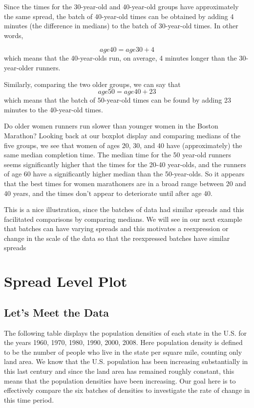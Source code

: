 \documentclass[
]{book}
\begin{document}
Since the times for the 30-year-old and 40-year-old groups have approximately the same spread, the batch of 40-year-old times can be obtained by adding 4 minutes (the difference in medians) to the batch of 30-year-old times. In other words,

\[
age40 = age30 + 4
\]
which means that the 40-year-olds run, on average, 4 minutes longer than the 30-year-older runners.

Similarly, comparing the two older groups, we can say that
\[
age50 = age40 + 23
\]
which means that the batch of 50-year-old times can be found by adding 23 minutes to the 40-year-old times.

Do older women runners run slower than younger women in the Boston Marathon? Looking back at our boxplot display and comparing medians of the five groups, we see that women of ages 20, 30, and 40 have (approximately) the same median completion time. The median time for the 50 year-old runners seems significantly higher that the times for the 20-40 year-olds, and the runners of age 60 have a significantly higher median than the 50-year-olds. So it appears that the best times for women marathoners are in a broad range between 20 and 40 years, and the times don't appear to deteriorate until after age 40.

This is a nice illustration, since the batches of data had similar spreads and this facilitated comparisons by comparing medians. We will see in our next example that batches can have varying spreads and this motivates a reexpression or change in the scale of the data so that the reexpressed batches have similar spreads

\hypertarget{spread-level-plot}{%
\chapter{Spread Level Plot}\label{spread-level-plot}}

\hypertarget{lets-meet-the-data}{%
\section{Let's Meet the Data}\label{lets-meet-the-data}}

The following table displays the population densities of each state in the U.S. for the years 1960, 1970, 1980, 1990, 2000, 2008. Here population density is defined to be the number of people who live in the state per square mile, counting only land area. We know that the U.S. population has been increasing substantially in this last century and since the land area has remained roughly constant, this means that the population densities have been increasing. Our goal here is to effectively compare the six batches of densities to investigate the rate of change in this time period.
\end{document}
